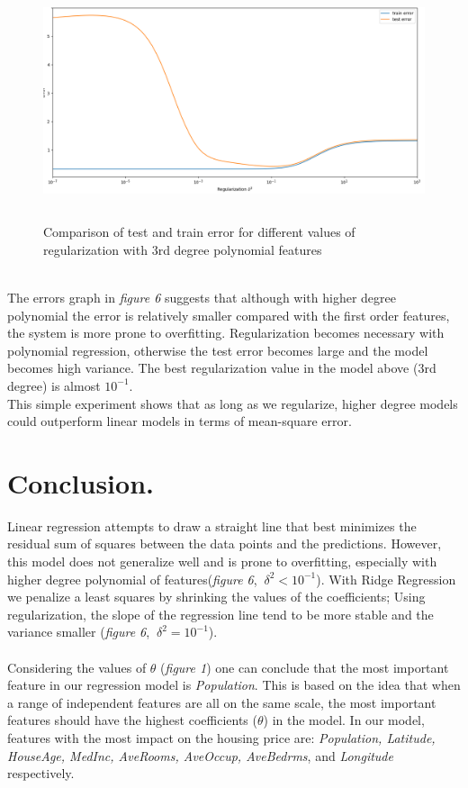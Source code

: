 \documentclass[a4paper,11pt]{article}
\begin{document}
\begin{figure}[!htb]
	\centering
	\includegraphics[width=15cm, height=7cm]{plotB_3_1.png}
	\caption{\small Comparison of test and train error for different values of regularization with 3rd degree polynomial features}
\end{figure}
\noindent
\\ The errors graph in \textit{figure 6} suggests that although with higher degree polynomial the error is relatively smaller compared with the first order features, the system is more prone to overfitting. Regularization becomes necessary with polynomial regression, otherwise the test error becomes large and the model becomes high variance. The best regularization value in the model above (3rd degree) is almost $10^{-1}$. \\
This simple experiment shows that as long as we regularize, higher degree models could outperform linear models in terms of mean-square error.



\section{Conclusion.}
Linear regression attempts to draw a straight line that best minimizes the residual sum of squares between the data points and the predictions. However, this model does not generalize well and is prone to overfitting, especially with higher degree polynomial of features(\textit{figure 6}, $\ \delta^2<10^{-1}$). With Ridge Regression we penalize a least squares by shrinking the values of the coefficients; Using regularization, the slope of the regression line tend to be more stable and the variance smaller (\textit{figure 6}, $\ \delta^2=10^{-1}$). \\\\
Considering the values of $\theta$ (\textit{figure 1}) one can conclude that the most important feature in our regression model is \textit{Population}. This is based on the idea that when a range of independent features are all on the same scale, the most important features should have the highest coefficients ($\theta$) in the model. In our model, features with the most impact on the housing price are: \textit{Population, Latitude, HouseAge, MedInc, AveRooms, AveOccup, AveBedrms}, and \textit{Longitude} respectively.
\end{document}

